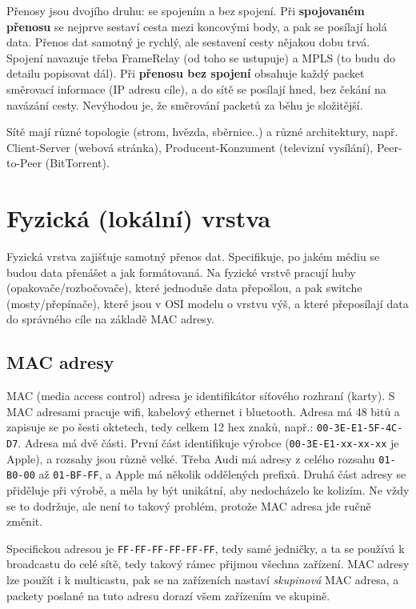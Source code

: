 Přenosy jsou dvojího druhu: se spojením a bez spojení. Při \textbf{spojovaném přenosu} se nejprve sestaví cesta mezi koncovými body, a pak se posílají holá data. Přenos dat samotný je rychlý, ale sestavení cesty nějakou dobu trvá. Spojení navazuje třeba FrameRelay (od toho se ustupuje) a MPLS   (to budu do detailu popisovat dál). Při \textbf{přenosu bez spojení} obsahuje každý packet směrovací informace (IP adresu cíle), a do sítě se posílají hned, bez čekání na navázání cesty. Nevýhodou je, že směrování packetů za běhu je složitější.

Sítě mají různé topologie (strom, hvězda, sběrnice..) a různé architektury, např. Client-Server (webová stránka), Producent-Konzument (televizní vysílání), Peer-to-Peer (BitTorrent).



\section{Fyzická (lokální) vrstva}

Fyzická vrstva zajišťuje samotný přenos dat. Specifikuje, po jakém médiu se budou data přenášet a jak formátovaná. Na fyzické vrstvě pracují huby (opakovače/rozbočovače), které jednoduše data přepošlou, a pak switche (mosty/přepínače), které jsou v OSI modelu o vrstvu výš, a které přeposílají data do správného cíle na základě MAC adresy.

\subsection{MAC adresy}
MAC (media access control) adresa je identifikátor síťového rozhraní (karty). S MAC adresami pracuje wifi, kabelový ethernet i bluetooth. Adresa má 48 bitů a zapisuje se po šesti oktetech, tedy celkem 12 hex znaků, např.: \texttt{00-3E-E1-5F-4C-D7}. Adresa má dvě části. První část identifikuje výrobce (\texttt{00-3E-E1-xx-xx-xx} je Apple), a rozsahy jsou různě velké. Třeba Audi má adresy z celého rozsahu \texttt{01-B0-00} až \texttt{01-BF-FF}, a Apple má několik oddělených prefixů. Druhá část adresy se přiděluje při výrobě, a měla by být unikátní, aby nedocházelo ke kolizím. Ne vždy se to dodržuje, ale není to takový problém, protože MAC adresa jde ručně změnit.

Specifickou adresou je \texttt{FF-FF-FF-FF-FF-FF}, tedy samé jedničky, a ta se používá k broadcastu do celé sítě, tedy takový rámec přijmou všechna zařízení. MAC adresy lze použít i k multicastu, pak se na zařízeních nastaví \textit{skupinová} MAC adresa, a packety poslané na tuto adresu dorazí všem zařízením ve skupině.

